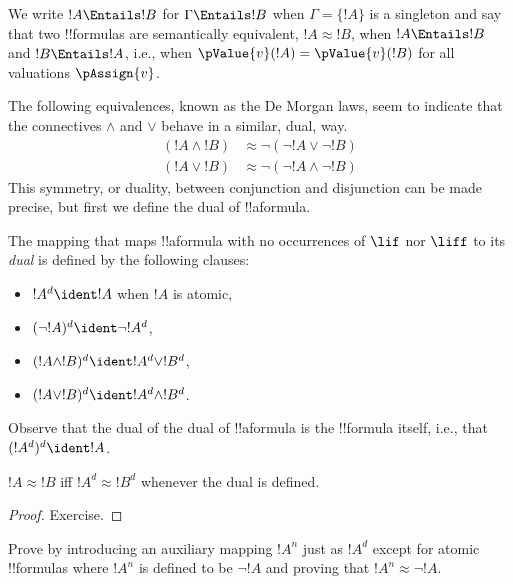 \documentclass[../../../include/open-logic-section]{subfiles}
\begin{document}
We write $!A \Entails !B$ for $\Gamma \Entails !B$ when $\Gamma = \{!A\}$ is a singleton and say that two !!{formula}s are semantically equivalent, $!A \approx !B$, when $!A \Entails !B$ and $!B \Entails !A$, i.e., when $\pValue{v}(!A) = \pValue{v}(!B)$ for all valuations $\pAssign{v}$.

The following equivalences, known as the De Morgan laws, seem to indicate that the connectives $\land$ and $\lor$ behave in a similar, dual, way. 
  \begin{align*}
    ({!A} \land {!B}) &\approx \lnot(\lnot{!A} \lor \lnot{!B})\\
    ({!A} \lor {!B}) &\approx \lnot(\lnot{!A} \land \lnot{!B})
  \end{align*}
This symmetry, or duality, between conjunction and disjunction can be made precise, but first we define the dual of !!a{formula}.

\begin{defn}
The mapping that maps !!a{formula} with no occurrences of $\lif$ nor $\liff$ to its \emph{dual} is defined by the following clauses:
\begin{itemize}
  \item $!A^d \ident !A$ when $!A$ is atomic,
  \item $(\lnot !A )^d \ident \lnot !A^d$,
  \item $(!A \land !B)^d \ident !A^d \lor !B^d$,
  \item $(!A \lor !B)^d \ident !A^d \land !B^d$.
\end{itemize}
\end{defn}

Observe that the dual of the dual of !!a{formula} is the !!{formula} itself, i.e., that $(!A^d)^d \ident !A$.

\begin{prop}
$!A \approx !B$ iff $!A^d \approx !B^d$ whenever the dual is defined.
\end{prop}
\begin{proof}
Exercise.
\end{proof}

\begin{prob}
Prove  by introducing an auxiliary mapping $!A^n$ just as $!A^d$ except for atomic !!{formula}s where $!A^n$ is defined to be $\lnot !A$ and proving that $!A^n \approx \lnot !A$.
\end{prob}
\end{document}

